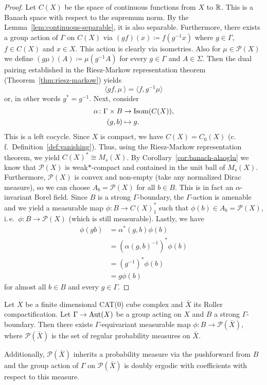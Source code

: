 \begin{proof}
  Let \(C(X)\) be the space of continuous functions from \(X\) to \(\mathbb{R}\).  This is a Banach space with respect to the supremum norm. By the Lemma~\ref{lem:continuous-separable}, it is also separable. Furthermore, there exists a group action of \(\Gamma\) on \(C(X)\) via \((gf)(x) \coloneqq f(g^{-1}x)\) where \(g \in \Gamma\), \(f \in C(X)\) and \(x \in X\). This action is clearly via isometries. Also for \(\mu \in \mathcal{P}(X)\) we define \((g\mu)(A) \coloneqq \mu(g^{-1} A)\) for every \(g \in \Gamma\) and \(A \in \Sigma\). Then the dual pairing established in the Riesz-Markow representation theorem (Theorem~\ref{thm:riesz-markow}) yields
  \[
    \langle gf, \mu\ \rangle = \langle f, g^{-1} \mu \rangle
  \]
  or, in other words \(g^\ast = g^{-1}\).
  Next, consider
  \begin{align*}
    \alpha\colon \Gamma \times B &\to \operatorname{Isom}(C(X)),\\
                 (g, b) &\mapsto g.
  \end{align*}
  This is a left cocycle.
  Since \(X\) is compact, we have \(C(X) = C_0(X)\) (c.\,f.\ Definition~\ref{def:vanishing}). Thus, using the Riesz-Markow representation theorem, we yield \(C(X)^\ast \cong M_{s}(X)\). By Corollary~\ref{cor:banach-alaoglu} we know that \(\mathcal{P}(X)\) is weak\(\ast\)-compact and contained in the unit ball of \(M_s(X)\). Furthermore, \(\mathcal{P}(X)\) is convex and non-empty (take any normalized Dirac measure), so we can choose \(A_b = \mathcal{P}(X)\) for all \(b \in B\). This is in fact an \(\alpha\)-invariant Borel field. Since \(B\) is a strong \(\Gamma\)-boundary, the \(\Gamma\)-action is amenable and we yield a measurable map \(\phi \colon B \to C(X)^\ast_1\) such that \(\phi(b) \in A_b = \mathcal{P}(X)\), i.\,e.\ \(\phi \colon B \to \mathcal{P}(X)\) (which is still measurable). Lastly, we have
  \begin{align*}
    \phi(gb) & = \alpha^\ast(g, b) \phi(b)\\
               & = \left(\alpha(g,b)^{-1}\right)^\ast \phi(b)\\
               & = \left ( g^{-1}\right)^\ast \phi(b)\\
               & = g\phi(b)
  \end{align*}
  for almost all \(b \in B\) and every \(g \in \Gamma\).
\end{proof}

\begin{cor}
  \label{cor:p(x)}
  Let \(X\) be a finite dimensional CAT(0) cube complex and \(\bar X\) its Roller compactification. Let \(\Gamma \to \operatorname{Aut}(X)\) be a group acting on \(X\) and \(B\) a strong \(\Gamma\)-boundary. Then there exists \(\Gamma\)-equivariant measurable map \(\phi\colon B \to \mathcal{P}(\bar X)\), where \(\mathcal{P}(\bar X)\) is the set of regular probability measures on \(\bar X\).

  Additionally, \(\mathcal{P}(\bar X)\) inherits a probability measure via the pushforward from \(B\) and the group action of \(\Gamma\) on \(\mathcal{P}(\bar X)\) is doubly ergodic with coefficients with respect to this measure.
\end{cor}

